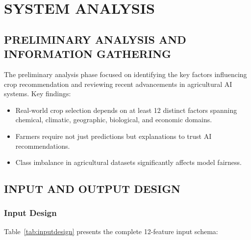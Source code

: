 \documentclass[12pt,a4paper,oneside]{report}
\begin{document}
\chapter{SYSTEM ANALYSIS}

\section{PRELIMINARY ANALYSIS AND INFORMATION GATHERING}

The preliminary analysis phase focused on identifying the key factors influencing crop recommendation and reviewing recent advancements in agricultural AI systems. Key findings:
\begin{itemize}[leftmargin=*, label=$\bullet$]
  \item Real-world crop selection depends on at least 12 distinct factors spanning chemical, climatic, geographic, biological, and economic domains.
  \item Farmers require not just predictions but explanations to trust AI recommendations.
  \item Class imbalance in agricultural datasets significantly affects model fairness.
\end{itemize}

\section{INPUT AND OUTPUT DESIGN}

\subsection{Input Design}

Table~\ref{tab:inputdesign} presents the complete 12-feature input schema:
\end{document}
